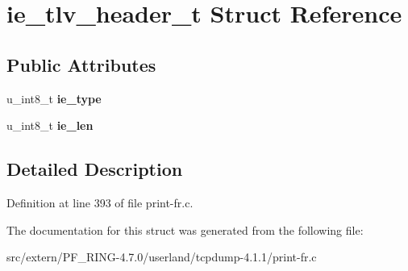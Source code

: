 \hypertarget{structie__tlv__header__t}{
\section{ie\_\-tlv\_\-header\_\-t Struct Reference}
\label{structie__tlv__header__t}
}
\subsection*{Public Attributes}
\begin{DoxyCompactItemize}
\item 
\hypertarget{structie__tlv__header__t_a9e756b34ce91c62df6d82732fb257dd9}{
u\_\-int8\_\-t {\bfseries ie\_\-type}}
\label{structie__tlv__header__t_a9e756b34ce91c62df6d82732fb257dd9}

\item 
\hypertarget{structie__tlv__header__t_a782c5fec9f4a52a61f79b7b78efd4e6a}{
u\_\-int8\_\-t {\bfseries ie\_\-len}}
\label{structie__tlv__header__t_a782c5fec9f4a52a61f79b7b78efd4e6a}

\end{DoxyCompactItemize}


\subsection{Detailed Description}


Definition at line 393 of file print-\/fr.c.



The documentation for this struct was generated from the following file:\begin{DoxyCompactItemize}
\item 
src/extern/PF\_\-RING-\/4.7.0/userland/tcpdump-\/4.1.1/print-\/fr.c\end{DoxyCompactItemize}
